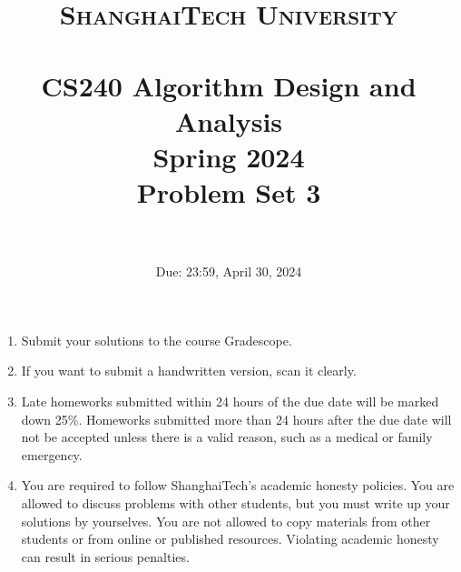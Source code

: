 \documentclass{article}
\title{
    \normalfont \normalsize
    \textsc{ShanghaiTech University} \\ [25pt]
    \horrule{0.5pt} \\[0.4cm] %
    \huge CS240 Algorithm Design and Analysis \\ %
    \LARGE Spring 2024\\
    \LARGE Problem Set 3\\
    \horrule{2pt} \\[0.5cm] %
}
\author{}
\date{Due: 23:59, April 30, 2024}
\begin{document}
\maketitle
\vspace{3ex}

\begin{enumerate}
\item Submit your solutions to the course Gradescope.
\item If you want to submit a handwritten version, scan it clearly.
\item Late homeworks submitted within 24 hours of the due date will be marked down 25\%.  Homeworks submitted more than 24 hours after the due date will not be accepted unless there is a valid reason, such as a medical or family emergency.  
\item You are required to follow ShanghaiTech's academic honesty policies.  You are allowed to discuss problems with other students, but you must write up your solutions by yourselves.  You are not allowed to copy materials from other students or from online or published resources.  Violating academic honesty can result in serious penalties.  
\end{enumerate}

\newpage

\end{document}
